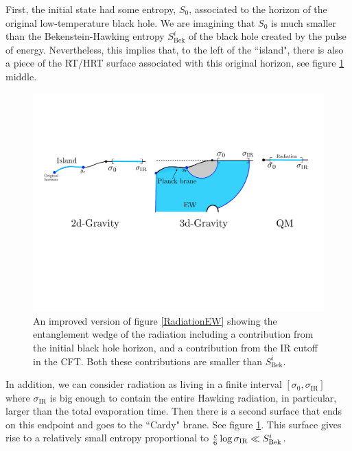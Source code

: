 \documentclass[12pt]{article}
\begin{document}
First, the initial state had some entropy, $S_0$, associated to the horizon of the original low-temperature black hole. 
We are imagining that $S_0$ is much smaller than the Bekenstein-Hawking entropy $S^i_{\text{Bek}}$ of the black hole created by the pulse of energy.
Nevertheless, this implies that, to the left of the ``island", there is also a piece of the RT/HRT surface associated with this original horizon, see figure \ref{RaditionEWBetter} middle.
   
\begin{figure}[ht]
    \begin{center}
    \includegraphics[scale=.47]{Figures/RadiationEWBetter}
    \end{center}
    \caption{An improved version of figure \ref{RadiationEW} showing the entanglement wedge of the radiation including a contribution from the initial black hole horizon, and a contribution from the IR cutoff in the CFT. 
    Both these contributions are smaller than $S^i_\text{Bek}$.}
    \label{RaditionEWBetter}
\end{figure}

In addition, we can consider radiation as living in a finite interval $[\sigma_0 ,\sigma_{\text{IR}}]$ where $\sigma_{\text{IR}}$ is big enough to contain the entire Hawking radiation, in particular, larger than the total evaporation time.
Then there is a second surface that ends on this endpoint and goes to the ``Cardy" brane.
See figure  \ref{RaditionEWBetter}.
This surface gives rise to a relatively small entropy proportional to ${c \over 6 } \log \sigma_{\text{IR}} \ll S^i_{\rm Bek}$.
   
\end{document}
